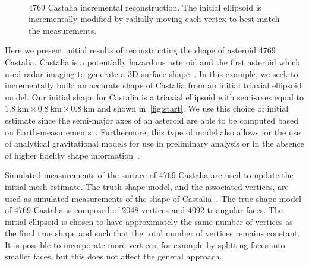 \begin{figure}[h]
    ~
    \caption{4769 Castalia incremental reconstruction. The initial ellipsoid is incrementally modified by radially moving each vertex to best match the measurements.~\label{fig:reconstruction}}
\end{figure}

Here we present initial results of reconstructing the shape of asteroid 4769 Castalia.
Castalia is a potentially  hazardous asteroid and the first asteroid which used radar imaging to generate a 3D surface shape~\cite{hudson1994}.
In this example, we seek to incrementally build an accurate shape of Castalia from an initial triaxial ellipsoid model.
Our initial shape for Castalia is a triaxial ellipsoid with semi-axes equal to \( \SI{1.8}{\kilo\meter} \times \SI{0.8}{\kilo\meter} \times \SI{0.8}{\kilo\meter}\) and shown in~\cref{fig:start}.
We use this choice of initial estimate since the semi-major axes of an asteroid are able to be computed based on Earth-measurements~\cite{busch2011}.
Furthermore, this type of model also allows for the use of analytical gravitational models for use in preliminary analysis or in the absence of higher fidelity shape information~\cite{scheeres1994}.

Simulated measurements of the surface of 4769 Castalia are used to update the initial mesh estimate.
The truth shape model, and the associated vertices, are used as simulated measurements of the shape of Castalia~\cite{neese2004}.
The true shape model of 4769 Castalia is composed of \num{2048} vertices and \num{4092} triangular faces.
The initial ellipsoid is chosen to have approximately the same number of vertices as the final true shape and such that the total number of vertices remains constant.
It is possible to incorporate more vertices, for example by splitting faces into smaller faces, but this does not affect the general approach.
